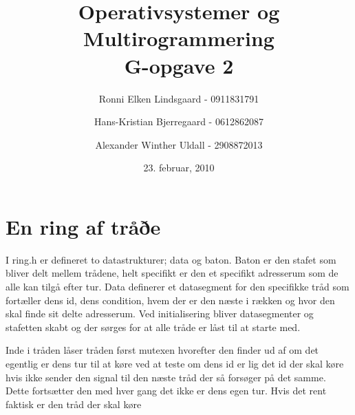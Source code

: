 \documentclass[titlepage]{article}
\title{Operativsystemer og Multirogrammering \\G-opgave 2}
\author{Ronni Elken Lindsgaard - 0911831791 \and
Hans-Kristian Bjerregaard - 0612862087 \and
Alexander Winther Uldall - 2908872013}
\date{23. februar, 2010}
\begin{document}
\maketitle
\newpage
\section{En ring af tråðe}
I ring.h er defineret to datastrukturer; data og baton. Baton er den stafet som bliver delt mellem trådene, helt specifikt er den et specifikt adresserum som de alle kan tilgå efter tur.
Data definerer et datasegment for den specifikke tråd som fortæller dens id, dens condition, hvem der er den næste i rækken og hvor den skal finde sit delte adresserum.
Ved initialisering bliver datasegmenter og stafetten skabt og der sørges for at alle tråde er låst til at starte med.

Inde i tråden låser tråden først mutexen hvorefter den finder ud af om det egentlig er dens tur til at køre ved at teste om dens id er lig det id der skal køre hvis ikke sender den signal til den næste tråd der så forsøger på det samme. Dette fortsætter den med hver gang det ikke er dens egen tur.
Hvis det rent faktisk er den tråd der skal køre
\end{document}
